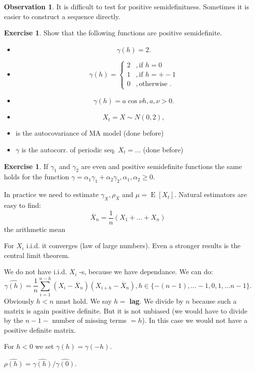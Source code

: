 \documentclass[12pt,a4paper, notitlepage]{book}
\theoremstyle{definition} %
\newtheorem{exercise}[definition]{Exercise}
\newtheorem{observation}[definition]{Observation}
\theoremstyle{plain} %
\DeclareMathOperator{\E}{E}
\begin{document}
\begin{observation}
It is difficult to test for positive semidefinitness. Sometimes it is easier to construct a sequence directly.
\end{observation}

\begin{exercise}
Show that the following functions are positive semidefinite.
\begin{itemize}
\item \[ \gamma(h) = 2 . \]
\item \[ \gamma(h) = \begin{cases} 2 & , \text{if } h = 0 \\
  1 & , \text{if } h = +-1 \\
 0 &  ,  \text{otherwise } . \end{cases} \]
\item \[ \gamma(h) = a \cos{\nu h}, a, \nu > 0 . \]
\end{itemize}
\begin{itemize}
\item  \[ X_t = X \sim N(0,2) , \]
\item is the autocovariance of MA model (done before)
\item $\gamma$ is the autocorr. of periodic seq. $X_t = \dots$ (done before)
\end{itemize}


\end{exercise}

\begin{exercise}
If $\gamma_1$ and $\gamma_2$ are even and positive semidefinite functions the same holds for the function 
$\gamma = \alpha_1 \gamma_1 + \alpha_2 \gamma_2, \alpha_1, \alpha_2 \geq 0$. 


In practice we need to estimate $\gamma_X, \rho_X$ and $\mu = \E[X_t]$. Natural estimators are easy to find:
\[ \overline{X} _n = \frac{1}{n} \left(X_1 + \dots + X_n \right) \]  the arithmetic mean

For  $X_i $ i.i.d. it converges (law of large numbers). Even a stronger results is the central limit theorem.

We do not have i.i.d. $ X_ i $ -s, because we have dependance. We can do:
\[ \hat{\gamma(h)} =  \frac{1}{n} \sum_{i = 1}^{n- h}   (X_i - \overline{X}_n)(X_{i+h} - \overline{X}_n) , h \in \{ -(n-1), \ldots -1, 0, 1, \ldots n-1 \} . \]
Obviously $h < n$ must hold. We say $h =$ {\bf  lag}.
We divide by $n$ because such a matrix is again positive definite. But it is not unbiased (we would have to divide 
by the $n - 1 - $ number of missing terms $= h$). In this case we would not have a positive definite matrix. 

For $h < 0$ we set $\gamma(h) = \gamma(-h)$.

$\hat{\rho(h)} = \hat{\gamma(h)} / \hat{\gamma(0)}$.

\end{exercise}
\end{document}
